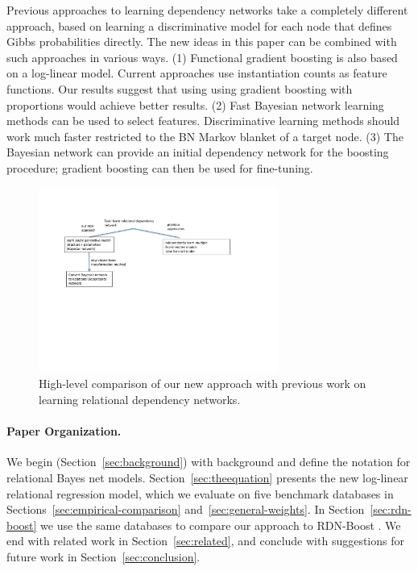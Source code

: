 \documentclass[runningheads,a4paper]{llncs}
\newcommand{\strongpoint}[1]{\paragraph{#1.}}
\begin{document}
Previous approaches to learning dependency networks take a completely different approach, based on learning a discriminative model for each node that defines Gibbs probabilities directly. The new ideas in this paper can be combined with such approaches in various ways. (1) Functional gradient boosting is also based on a log-linear model. Current approaches use instantiation counts as feature functions. Our results suggest that using using gradient boosting with proportions would achieve better results. (2) Fast Bayesian network learning methods can be used to select features. Discriminative learning methods should work much faster restricted to the BN Markov blanket of a target node. (3) The Bayesian network can provide an initial dependency network for the boosting procedure; gradient boosting can then be used for fine-tuning.

\begin{figure}[htbp]
\begin{center}
\includegraphics[width=0.7\textwidth]{novelty}
\caption{High-level comparison of our new approach with previous work on learning relational dependency networks.}
\label{fig:novelty}
\end{center}
\end{figure}


\strongpoint{Paper Organization}
We begin (Section~\ref{sec:background}) with background and define the notation for relational Bayes net models.
Section~\ref{sec:theequation} presents the new log-linear relational regression model, which we evaluate
on five benchmark databases in Sections~\ref{sec:empirical-comparison} and~\ref{sec:general-weights}.
In Section~\ref{sec:rdn-boost} we use the same databases to compare our approach to RDN-Boost \cite{Khot2011}.
We end with related work in Section~\ref{sec:related}, and conclude with suggestions for future work in Section~\ref{sec:conclusion}.
\end{document}
